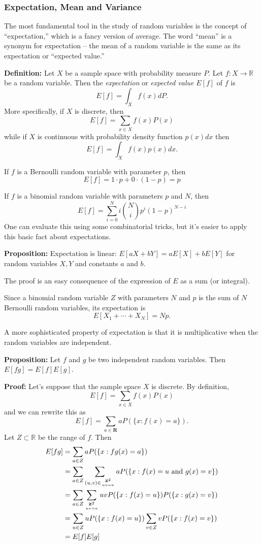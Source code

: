 \documentclass[
]{article}
\begin{document}
\hypertarget{expectation-mean-and-variance}{%
\subsubsection{Expectation, Mean and
Variance}\label{expectation-mean-and-variance}}

The most fundamental tool in the study of random variables is the
concept of ``expectation,'' which is a fancy version of average. The
word ``mean'' is a synonym for expectation -- the mean of a random
variable is the same as its expectation or ``expected value.''

\textbf{Definition:} Let \(X\) be a sample space with probability
measure \(P\). Let \(f:X\to \mathbb{R}\) be a random variable. Then the
\emph{expectation} or \emph{expected value} \(E[f]\) of \(f\) is \[
E[f] = \int_X f(x)dP.
\] More specifically, if \(X\) is discrete, then \[
E[f] = \sum_{x\in X} f(x)P(x)
\] while if \(X\) is continuous with probability density function
\(p(x)dx\) then \[
E[f] = \int_{X} f(x)p(x)dx.
\]

If \(f\) is a Bernoulli random variable with parameter \(p\), then \[
E[f] = 1\cdot p+0\cdot (1-p) = p
\]

If \(f\) is a binomial random variable with parameters \(p\) and \(N\),
then \[
E[f] = \sum_{i=0}^{N} i\binom{N}{i}p^{i}(1-p)^{N-i}
\] One can evaluate this using some combinatorial tricks, but it's
easier to apply this basic fact about expectations.

\textbf{Proposition:} Expectation is linear: \(E[aX+bY]=aE[X]+bE[Y]\)
for random variables \(X,Y\) and constants \(a\) and \(b\).

The proof is an easy consequence of the expression of \(E\) as a sum (or
integral).

Since a binomial random variable \(Z\) with parameters \(N\) and \(p\)
is the sum of \(N\) Bernoulli random variables, its expectation is \[
E[X_1+\cdots+X_N]=Np.
\]

A more sophisticated property of expectation is that it is
multiplicative when the random variables are independent.

\textbf{Proposition:} Let \(f\) and \(g\) be two independent random
variables. Then \(E[fg]=E[f]E[g]\).

\textbf{Proof:} Let's suppose that the sample space \(X\) is discrete.
By definition, \[
E[f]=\sum_{x\in X}f(x)P(x)
\] and we can rewrite this as \[
E[f]=\sum_{a\in\mathbf{R}} aP(\{x: f(x)=a\}).
\] Let \(Z\subset\mathbb{R}\) be the range of \(f\). Then \begin{align*}
E[fg]&=\sum_{a\in Z} aP(\{x: fg(x)=a\}) \\
&=\sum_{a\in Z}\sum_{(u,v)\in\genfrac{}{}{0pt}{}{\mathbf{Z}^{2}}{uv=a}}aP(\{x:f(x)=u\hbox{\rm\ and\ }g(x)=v\}) \\
&=\sum_{a\in Z}\sum_{\genfrac{}{}{0pt}{}{\mathbf{Z}^{2}}{uv=a}}uvP(\{x:f(x)=u\})P(\{x:g(x)=v\}) \\
&=\sum_{u\in Z}uP(\{x:f(x)=u\})\sum_{v\in Z}vP(\{x:f(x)=v\}) \\
&=E[f]E[g] 
\end{align*}
\end{document}
